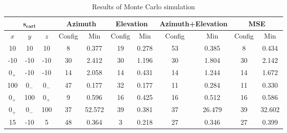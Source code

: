 \begin{table}[!htbp] %
	\begin{center}
		\begin{tabular}{ c c c |c c | c c | c c | c c }
			\toprule
			\multicolumn{3}{c|}{\textbf{$\bm{s_{cart}}$}} & \multicolumn{2}{c|}{\textbf{Azimuth}} & \multicolumn{2}{c|}{\textbf{Elevation}} & \multicolumn{2}{c|}{\textbf{Azimuth+Elevation}} & \multicolumn{2}{c}{\textbf{MSE}}   \\
			\midrule
			\multicolumn{1}{c}{$x$} & $y$ & $z$ & Config & Min  & Config & Min & Config & Min & Config & Min \\
			\midrule
			\multirow{1}{*}{10} & 10 & 10 & 8 & 0.377 & 19 & 0.278 &  53 & 0.385 & 8  & 0.434\\
			\midrule
			\multirow{1}{*}{-10} & -10 & -10 & 30 & 2.412 & 30 & 1.196 &  30 & 1.804 & 30  & 2.142\\
			\midrule
			\multirow{1}{*}{$0_{+}$} & -10 & -10 & 14 & 2.058 & 14 & 0.431 & 14 & 1.244  & 14  & 1.672 \\
			\midrule
			\multirow{1}{*}{100} & $0_{-}$ & $0_{-}$ & 47 & 0.177 & 32 & 0.177  & 11 & 0.284  & 11  & 0.330 \\
			\midrule
			\multirow{1}{*}{$0_{+}$} & 100 & $0_{+}$ & 9 & 0.596 & 16 & 0.425 & 16 & 0.512 & 16 & 0.586 \\
			\midrule
			\multirow{1}{*}{$0_{+}$} & $0_{-}$ & 100 & 37 & 52.572  & 39  & 0.381 & 37 & 26.479  & 39 & 32.602 \\
			\midrule
			\multirow{1}{*}{15} & -10 & 5 & 48 & 0.364 & 3 & 0.218 & 27 & 0.346 & 27 & 0.399 \\
			\bottomrule 
		\end{tabular}
		\caption{Results of Monte Carlo simulation}
		\label{tab:montecarlo-best1}
	\end{center}
\end{table}

